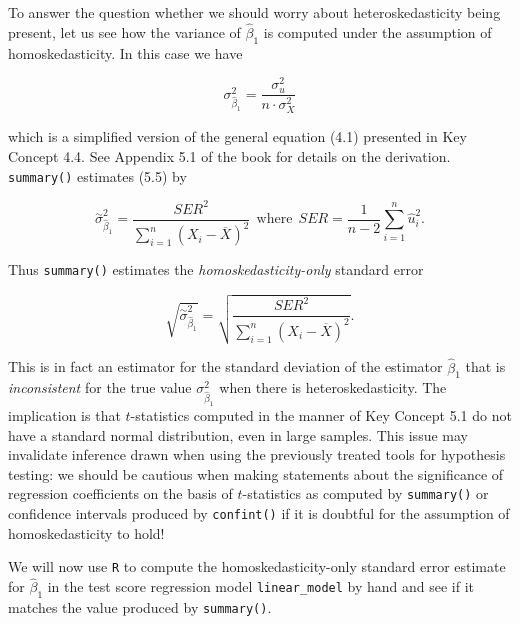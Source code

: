 \documentclass[]{book}
\newenvironment{Shaded}{\begin{snugshade}}{\end{snugshade}}
\newcommand{\KeywordTok}[1]{\textcolor[rgb]{0.13,0.29,0.53}{\textbf{#1}}}
\newcommand{\DecValTok}[1]{\textcolor[rgb]{0.00,0.00,0.81}{#1}}
\newcommand{\FloatTok}[1]{\textcolor[rgb]{0.00,0.00,0.81}{#1}}
\newcommand{\StringTok}[1]{\textcolor[rgb]{0.31,0.60,0.02}{#1}}
\newcommand{\CommentTok}[1]{\textcolor[rgb]{0.56,0.35,0.01}{\textit{#1}}}
\newcommand{\OperatorTok}[1]{\textcolor[rgb]{0.81,0.36,0.00}{\textbf{#1}}}
\newcommand{\NormalTok}[1]{#1}
\theoremstyle{definition}
\theoremstyle{definition}
\theoremstyle{definition}
\theoremstyle{remark}
\begin{document}
To answer the question whether we should worry about heteroskedasticity
being present, let us see how the variance of \(\hat\beta_1\) is
computed under the assumption of homoskedasticity. In this case we have

\[ \sigma^2_{\hat\beta_1} = \frac{\sigma^2_u}{n \cdot \sigma^2_X} \tag{5.5} \]

which is a simplified version of the general equation (4.1) presented in
Key Concept 4.4. See Appendix 5.1 of the book for details on the
derivation. \texttt{summary()} estimates (5.5) by

\[ \overset{\sim}{\sigma}^2_{\hat\beta_1} = \frac{SER^2}{\sum_{i=1}^n (X_i - \overline{X})^2} \ \ \text{where} \ \ SER=\frac{1}{n-2} \sum_{i=1}^n \hat u_i^2. \]

Thus \texttt{summary()} estimates the \emph{homoskedasticity-only}
standard error

\[ \sqrt{ \overset{\sim}{\sigma}^2_{\hat\beta_1} } = \sqrt{ \frac{SER^2}{\sum_{i=1}^n(X_i - \overline{X})^2} }. \]

This is in fact an estimator for the standard deviation of the estimator
\(\hat{\beta}_1\) that is \emph{inconsistent} for the true value
\(\sigma^2_{\hat\beta_1}\) when there is heteroskedasticity. The
implication is that \(t\)-statistics computed in the manner of Key
Concept 5.1 do not have a standard normal distribution, even in large
samples. This issue may invalidate inference drawn when using the
previously treated tools for hypothesis testing: we should be cautious
when making statements about the significance of regression coefficients
on the basis of \(t\)-statistics as computed by \texttt{summary()} or
confidence intervals produced by \texttt{confint()} if it is doubtful
for the assumption of homoskedasticity to hold!

We will now use \texttt{R} to compute the homoskedasticity-only standard
error estimate for \(\hat{\beta}_1\) in the test score regression model
\texttt{linear\_model} by hand and see if it matches the value produced
by \texttt{summary()}.

\begin{Shaded}
\end{Shaded}
\end{document}
